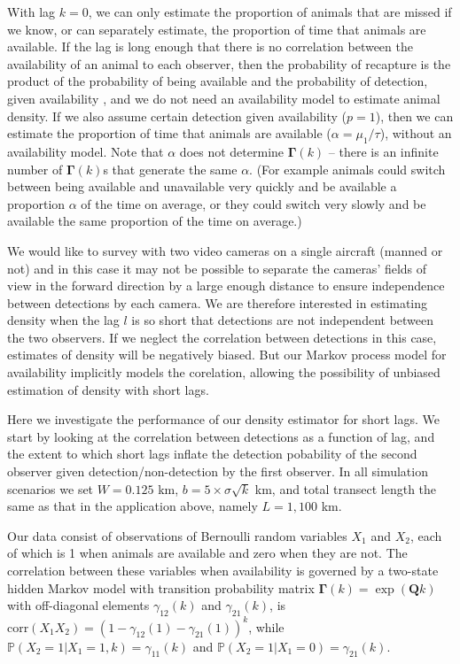 \documentclass[useAMS, usenatbib, referee]{biom}\usepackage[]{graphicx}\usepackage[]{color}
\begin{document}
With lag $k=0$, we can only estimate the proportion of animals that are missed if we know, or can separately estimate, the proportion of time that animals are available. If the lag is long enough that there is no correlation between the availability of an animal to each observer, then the probability of  recapture is the product of the probability of being available and the probability of detection, given availability \citep[see][]{Hayes+Buckland:83}, and we do not need an availability model to estimate animal density. If we also assume certain detection given availability ($p=1$), then we can estimate the proportion of time that animals are available ($\alpha=\mu_1/\tau$), without an availability model. Note that $\alpha$ does not determine $\bm{\Gamma}(k)$ -- there is an infinite number of $\bm{\Gamma}(k)$s that generate the same $\alpha$. (For example animals could switch between being available and unavailable very quickly and be available a proportion $\alpha$ of the time on average, or they could switch very slowly and be available the same proportion of the time on average.)

We would like to survey with two video cameras on a single aircraft (manned or not) and in this case it may not be possible to separate the cameras' fields of view in the forward direction by a large enough distance to ensure independence between detections by each camera. We are therefore interested in estimating density when the lag $l$ is so short that detections are not independent between the two observers. If we neglect the correlation between detections in this case, estimates of density will be negatively biased. But our Markov process model for availability implicitly models the corelation, allowing the possibility of unbiased estimation of density with short lags. 

Here we investigate the performance of our density estimator for short lags. We start by looking at the correlation between detections as a function of lag, and the extent to which short lags inflate the detection pobability of the second observer given detection/non-detection by the first observer. In all simulation scenarios we set $W=0.125$ km, $b=5\times\sigma\sqrt{k}$ km, and total transect length the same as that in the application above, namely $L=1,100$ km.

Our data consist of observations of Bernoulli random variables $X_1$ and $X_2$, each of which is 1 when animals are available and zero when they are not. The correlation between these variables when availability is governed by a two-state hidden Markov model with transition probability matrix $\bm{\Gamma}(k)=\exp(\bm{Q}k)$ with off-diagonal elements $\gamma_{12}(k)$ and $\gamma_{21}(k)$, is $\text{corr}(X_1X_2)=(1-\gamma_{12}(1)-\gamma_{21}(1))^k$, while $\mathbb{P}(X_2=1|X_1=1,k)=\gamma_{11}(k)$ and $\mathbb{P}(X_2=1|X_1=0)=\gamma_{21}(k)$.
\end{document}
